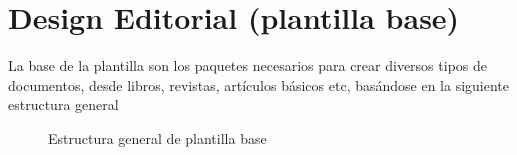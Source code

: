 {\justifying
\chapter{Design Editorial (plantilla base)}\label{cap:designEditorial}
	La base de la plantilla son los paquetes necesarios para crear diversos tipos de documentos, desde libros, revistas, artículos básicos etc, basándose en la siguiente estructura general
	\begin{figure}[H]
		\centering
		
		\caption{Estructura general de plantilla base}
		\label{fig:estructuraPlantillaBaseGeneral}
	\end{figure}
}

